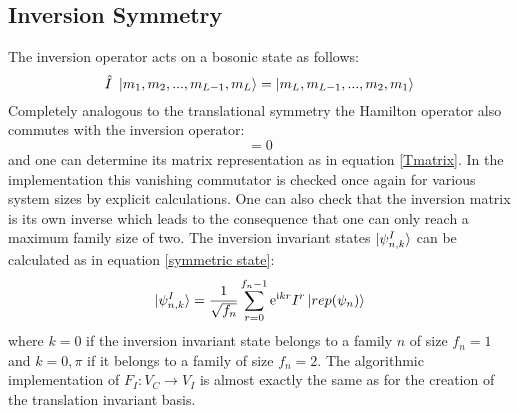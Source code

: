 \documentclass{scrartcl}
\begin{document}
\subsection{Inversion Symmetry}
The inversion operator acts on a bosonic state as follows:
\begin{equation*}
    \hat{I}\ \ket{m_1,m_2,...,m_{L-1},m_L}=\ket{m_L,m_{L-1},...,m_{2},m_1}
\end{equation*}
Completely analogous to the translational symmetry the Hamilton operator also commutes with the inversion operator:
\begin{equation*}
    [\hat{H},\hat{I}]=0
\end{equation*}
and one can determine its matrix representation as in equation \ref{Tmatrix}. In the implementation this vanishing commutator is checked once again for various system sizes by explicit calculations. One can also check that the inversion matrix is its own inverse which leads to the consequence that one can only reach a maximum family size of two. The inversion invariant states $\ket{\psi_{n,k}^I}$ can be calculated as in equation \ref{symmetric state}:
\begin{equation}
    \ket{\psi_{n,k}^I}=\frac{1}{\sqrt{f_n}} \sum ^{f_n-1}_{r=0} \mathrm{e}^{\mathrm{i}kr} I^r \ket{rep(\psi_n)}
    \label{inversoin symmetric}
\end{equation}
where $k=0$ if the inversion invariant state belongs to a family $n$ of size $f_n=1$ and $k=0,\pi$ if it belongs to a family of size $f_n=2$. The algorithmic implementation of $F_I:V_C \rightarrow V_I$ is almost exactly the same as for the creation of the translation invariant basis. 
\end{document}
